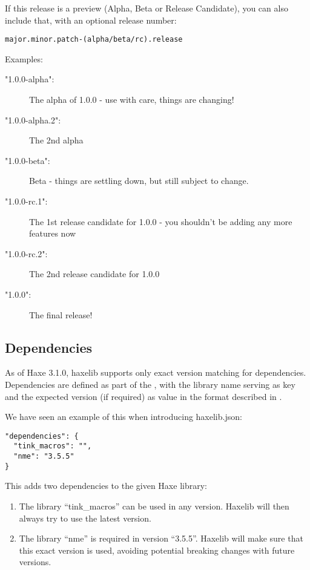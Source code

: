 If this release is a preview (Alpha, Beta or Release Candidate), you can also include that, with an optional release number:

\begin{lstlisting}
major.minor.patch-(alpha/beta/rc).release
\end{lstlisting}

Examples:

\begin{description}
\item["1.0.0-alpha":] The alpha of 1.0.0 - use with care, things are changing!
\item["1.0.0-alpha.2":] The 2nd alpha
\item["1.0.0-beta":] Beta - things are settling down, but still subject to change.
\item["1.0.0-rc.1":] The 1st release candidate for 1.0.0 - you shouldn't be adding any more features now
\item["1.0.0-rc.2":] The 2nd release candidate for 1.0.0
\item["1.0.0":] The final release!  
\end{description}


\subsection{Dependencies}
\label{haxelib-json-dependencies}

As of Haxe 3.1.0, haxelib supports only exact version matching for dependencies. Dependencies are defined as part of the , with the library name serving as key and the expected version (if required) as value in the format described in .

We have seen an example of this when introducing haxelib.json:

\begin{lstlisting}
"dependencies": {
  "tink_macros": "",
  "nme": "3.5.5"
}
\end{lstlisting}

This adds two dependencies to the given Haxe library:

\begin{enumerate}
	\item The library ``tink_macros'' can be used in any version. Haxelib will then always try to use the latest version.
	\item The library ``nme'' is required in version ``3.5.5''. Haxelib will make sure that this exact version is used, avoiding potential breaking changes with future versions.
\end{enumerate}


